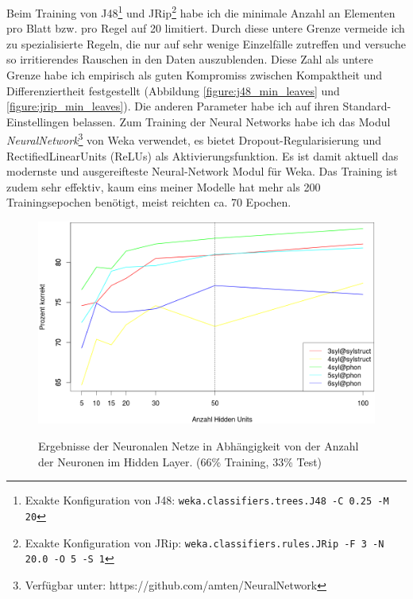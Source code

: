 Beim Training von J48\footnote{Exakte Konfiguration von J48: \texttt{weka.classifiers.trees.J48 -C 0.25 -M 20}} und JRip\footnote{Exakte Konfiguration von JRip: \texttt{weka.classifiers.rules.JRip -F 3 -N 20.0 -O 5 -S 1}} habe ich die minimale Anzahl an Elementen pro Blatt bzw. pro Regel auf 20 limitiert. Durch diese untere Grenze vermeide ich zu spezialisierte Regeln, die nur auf sehr wenige Einzelfälle zutreffen und versuche so irritierendes Rauschen in den Daten auszublenden. Diese Zahl als untere Grenze habe ich empirisch als guten Kompromiss zwischen Kompaktheit und Differenziertheit festgestellt (Abbildung \ref{figure:j48_min_leaves} und \ref{figure:jrip_min_leaves}). Die anderen Parameter habe ich auf ihren Standard-Einstellingen belassen.
Zum Training der Neural Networks habe ich das Modul \textit{NeuralNetwork}\footnote{Verfügbar unter: https://github.com/amten/NeuralNetwork} von Weka verwendet, es bietet Dropout-Regularisierung und RectifiedLinearUnits (ReLUs) als Aktivierungsfunktion. Es ist damit aktuell das modernste und ausgereifteste Neural-Network Modul für Weka. Das Training ist zudem sehr effektiv, kaum eins meiner Modelle hat mehr als 200 Trainingsepochen benötigt, meist reichten ca. 70 Epochen.\\
\begin{figure}[h]
    \centering
    \caption{Ergebnisse der Neuronalen Netze in Abhängigkeit von der Anzahl der Neuronen im Hidden Layer. (66\% Training, 33\% Test)}
    \includegraphics[width=.75\columnwidth]{figures/NN_HUs.png}
    \label{figure:NN_HUs}
\end{figure}
